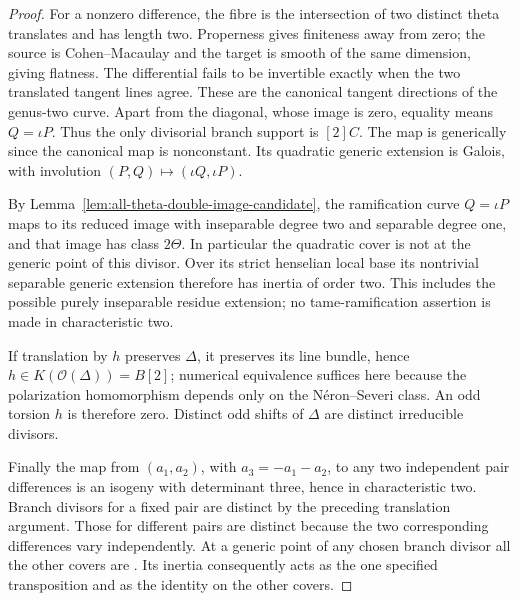 \begin{proof}
For a nonzero difference, the fibre is the intersection of two
distinct theta translates and has length two. Properness gives
finiteness away from zero; the source is Cohen--Macaulay and the
target is smooth of the same dimension, giving flatness.
The differential fails to be invertible exactly when the two
translated tangent lines agree. These are the canonical tangent
directions of the genus-two curve. Apart from the diagonal, whose
image is zero, equality means $Q=\iota P$. Thus the only
divisorial branch support is $[2]C$.
The map is generically \etale since the canonical map is
nonconstant. Its quadratic generic extension is Galois, with
involution $(P,Q)\mapsto(\iota Q,\iota P)$.

By Lemma~\ref{lem:all-theta-double-image-candidate}, the ramification
curve $Q=\iota P$ maps to its reduced image with inseparable
degree two and separable degree one, and that image has class
$2\Theta$. In particular the quadratic cover is not \etale at
the generic point of this divisor. Over its strict henselian
local base its nontrivial separable generic extension therefore
has inertia of order two. This includes the possible purely
inseparable residue extension; no tame-ramification assertion
is made in characteristic two.

If translation by $h$ preserves $\Delta$, it preserves its line
bundle, hence $h\in K(\mathcal O(\Delta))=B[2]$; numerical
equivalence suffices here because the polarization homomorphism
depends only on the N\'eron--Severi class. An odd torsion $h$ is
therefore zero. Distinct odd shifts of $\Delta$ are distinct
irreducible divisors.

Finally the map from $(a_1,a_2)$, with $a_3=-a_1-a_2$, to any
two independent pair differences is an isogeny with determinant
three, hence \etale in characteristic two. Branch divisors
for a fixed pair are distinct by the preceding translation
argument. Those for different pairs are distinct because the
two corresponding differences vary independently. At a generic
point of any chosen branch divisor all the other covers are
\etale. Its inertia consequently acts as the one specified
transposition and as the identity on the other covers.
\end{proof}

